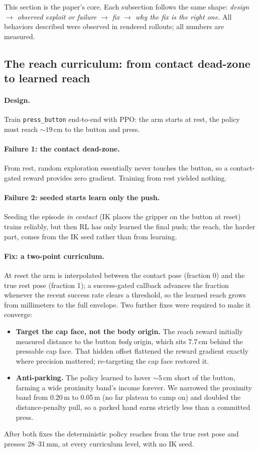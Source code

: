 \documentclass[11pt]{article}
\begin{document}
This section is the paper's core. Each subsection follows the same shape: \emph{design $\to$ observed exploit or failure $\to$ fix $\to$ why the fix is the right one.} All behaviors described were observed in rendered rollouts; all numbers are measured.

\subsection{The reach curriculum: from contact dead-zone to learned reach}
\label{sec:curriculum}

\paragraph{Design.} Train \texttt{press\_button} end-to-end with PPO: the arm starts at rest, the policy must reach ${\sim}19$\,cm to the button and press.

\paragraph{Failure 1: the contact dead-zone.} From rest, random exploration essentially never touches the button, so a contact-gated reward provides zero gradient. Training from rest yielded nothing.

\paragraph{Failure 2: seeded starts learn only the push.} Seeding the episode \emph{in contact} (IK places the gripper on the button at reset) trains reliably, but then RL has only learned the final push; the reach, the harder part, comes from the IK seed rather than from learning.

\paragraph{Fix: a two-point curriculum.} At reset the arm is interpolated between the contact pose (fraction 0) and the true rest pose (fraction 1); a success-gated callback advances the fraction whenever the recent success rate clears a threshold, so the learned reach grows from millimeters to the full envelope. Two further fixes were required to make it converge:
\begin{itemize}[nosep]
  \item \textbf{Target the cap face, not the body origin.} The reach reward initially measured distance to the button \emph{body} origin, which sits 7.7\,cm behind the pressable cap face. That hidden offset flattened the reward gradient exactly where precision mattered; re-targeting the cap face restored it.
  \item \textbf{Anti-parking.} The policy learned to hover ${\sim}5$\,cm short of the button, farming a wide proximity band's income forever. We narrowed the proximity band from 0.20\,m to 0.05\,m (no far plateau to camp on) and doubled the distance-penalty pull, so a parked hand earns strictly less than a committed press.
\end{itemize}
After both fixes the deterministic policy reaches from the true rest pose and presses 28--31\,mm, at every curriculum level, with no IK seed.
\end{document}
